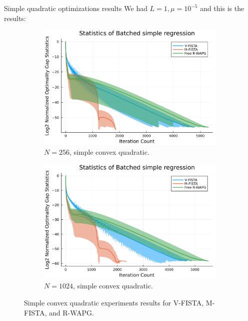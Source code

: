 \documentclass[11pt]{beamer}
\theoremstyle{definition}
\begin{document}
        \begin{frame}{Simple quadratic optimizations results}
            We had $L = 1, \mu = 10^{-5}$ and this is the results: 
            \begin{figure}[H]
                \begin{subfigure}[b]{0.47\textwidth}
                    \centering 
                    \includegraphics[width=\textwidth]{assets/simple_regression_batched-256.png}
                    \caption{$N = 256$, simple convex quadratic.}
                \end{subfigure}
                \hfill
                \begin{subfigure}[b]{0.47\textwidth}
                    \centering
                    \includegraphics[width=\textwidth]{assets/simple_regression_batched-1024.png}
                    \caption{$N = 1024$, simple convex quadratic. }
                \end{subfigure}
                \caption{Simple convex quadratic experiments results for V-FISTA, M-FISTA, and R-WAPG. }
                \label{fig:simple-quadratic-NOG}
            \end{figure}
        \end{frame}
\end{document}
